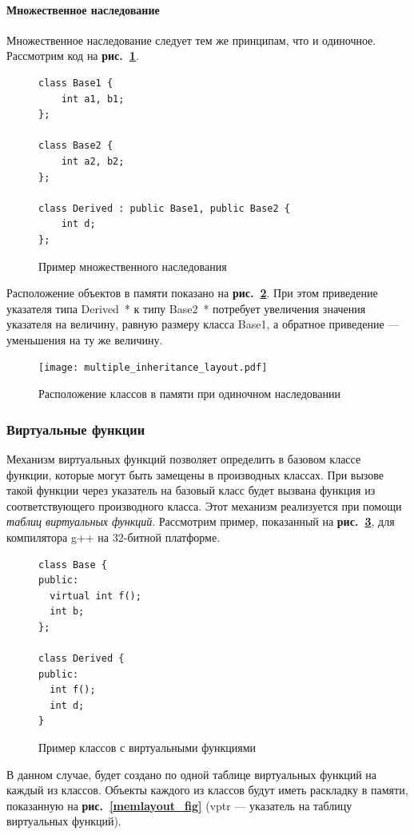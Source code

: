 \documentclass[a4paper,12pt,russian]{article}
\newcommand{\picref}[1]{\textbf{рис.~\ref{#1}}}
\newcommand{\code}[1]{\textsf{#1}}
\begin{document}
\paragraph{Множественное наследование}
Множественное наследование следует тем же принципам, что и одиночное. Рассмотрим код на \picref{multiple_inheritance_lst}.
\begin{figure}
\begin{lstlisting}
class Base1 {
    int a1, b1;
};

class Base2 {
    int a2, b2;
};

class Derived : public Base1, public Base2 {
    int d;
};
\end{lstlisting}
\caption{Пример множественного наследования}
\label{multiple_inheritance_lst}
\end{figure}
Расположение объектов в памяти показано на \picref{multiple_inheritance_layout_fig}.
При этом приведение указателя типа \code{Derived~*} к типу \code{Base2~*} потребует увеличения значения указателя на величину, равную размеру класса \code{Base1}, а обратное приведение --- уменьшения на ту же величину.
\begin{figure}
  \center
  \texttt{[image: multiple\_inheritance\_layout.pdf]}
  \hfill
  \caption{Расположение классов в памяти при одиночном наследовании}
  \label{multiple_inheritance_layout_fig}
\end{figure}

\subsubsection{Виртуальные функции}
\label{virtual_call}
Механизм виртуальных функций позволяет определить в базовом классе функции, которые могут быть замещены в производных классах.
При вызове такой функции через указатель на базовый класс будет вызвана функция из соответствующего производного класса.
Этот механизм реализуется при помощи \emph{таблиц виртуальных функций}.
Рассмотрим пример, показанный на \picref{virtual_functions_lst}, для компилятора g++ на 32-битной платформе.
\begin{figure}
\begin{lstlisting}
class Base {
public:
  virtual int f();
  int b;
};

class Derived {
public:
  int f();
  int d;
}
\end{lstlisting}
\caption{Пример классов с виртуальными функциями}
\label{virtual_functions_lst}
\end{figure}

В данном случае, будет создано по одной таблице виртуальных функций на каждый из классов.
Объекты каждого из классов будут иметь раскладку в памяти, показанную на \picref{memlayout_fig} (\code{vptr} --- указатель на таблицу виртуальных функций).
\end{document}
